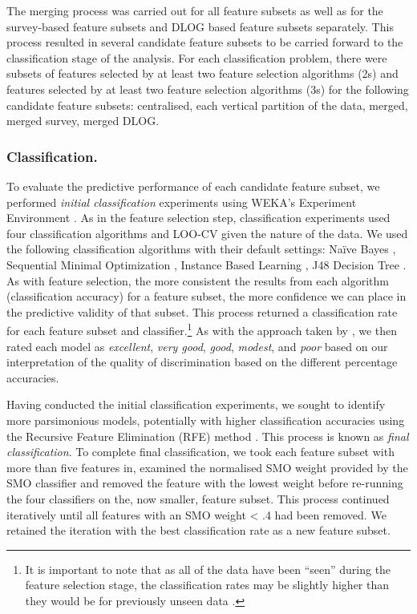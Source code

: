 \documentclass[
  12pt,
  a4paper,
]{book}
\begin{document}
The merging process was carried out for all feature subsets as well as for the survey-based feature subsets and DLOG based feature subsets separately. This process resulted in several candidate feature subsets to be carried forward to the classification stage of the analysis. For each classification problem, there were subsets of features selected by at least two feature selection algorithms (2s) and features selected by at least two feature selection algorithms (3s) for the following candidate feature subsets: centralised, each vertical partition of the data, merged, merged survey, merged DLOG.

\hypertarget{classification.}{%
\subsubsection{Classification.}\label{classification.}}

To evaluate the predictive performance of each candidate feature subset, we performed \emph{initial classification} experiments using WEKA's Experiment Environment \citep{Bouckaert2018, Frank2016}. As in the feature selection step, classification experiments used four classification algorithms and LOO-CV given the nature of the data. We used the following classification algorithms with their default settings: Naïve Bayes \citep[NB;][]{John1995}, Sequential Minimal Optimization \citep[SMO;][]{Platt1998}, Instance Based Learning \citep[IBk;][]{Aha1991}, J48 Decision Tree \citep[J48;][]{Quinlan1993}. As with feature selection, the more consistent the results from each algorithm (classification accuracy) for a feature subset, the more confidence we can place in the predictive validity of that subset. This process returned a classification rate for each feature subset and classifier.\footnote{It is important to note that as all of the data have been ``seen'' during the feature selection stage, the classification rates may be slightly higher than they would be for previously unseen data \citep{Kuncheva2018, Smialowski2010}.} As with the approach taken by \citet{Gullich2019}, we then rated each model as \emph{excellent}, \emph{very good}, \emph{good}, \emph{modest}, and \emph{poor} based on our interpretation of the quality of discrimination based on the different percentage accuracies.

Having conducted the initial classification experiments, we sought to identify more parsimonious models, potentially with higher classification accuracies using the Recursive Feature Elimination (RFE) method \citep{Guyon2002}. This process is known as \emph{final classification}. To complete final classification, we took each feature subset with more than five features in, examined the normalised SMO weight provided by the SMO classifier and removed the feature with the lowest weight before re-running the four classifiers on the, now smaller, feature subset. This process continued iteratively until all features with an SMO weight \textless{} .4 had been removed. We retained the iteration with the best classification rate as a new feature subset.
\end{document}
